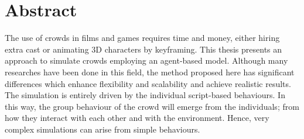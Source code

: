 
\ifx\isEmbedded\undefined


\fi

\section*{Abstract}
\label{sec:abstract}

{
The use of crowds in films and games requires time and money, either hiring extra cast or animating 3D characters by keyframing. This thesis presents an approach to simulate crowds employing an agent-based model. Although many researches have been done in this field, the method proposed here has significant differences which enhance flexibility and scalability and achieve realistic results. The simulation is entirely driven by the individual script-based behaviours. In this way, the group behaviour of the crowd will emerge from the individuals; from how they interact with each other and with the environment. Hence, very complex simulations can arise from simple behaviours.
}



\ifx\isEmbedded\undefined


\pagebreak

\fi